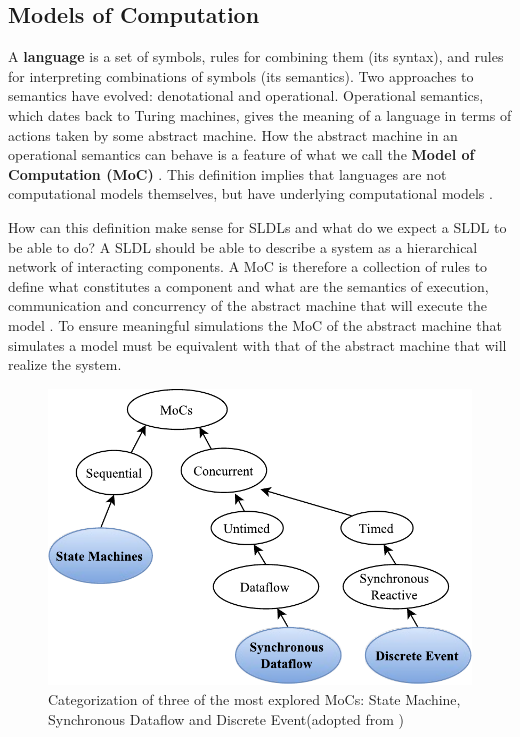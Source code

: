 \documentclass[12pt,twoside]{article}
\begin{document}
\subsection{Models of Computation}
\label{sec:orgheadline3}
A \textbf{language} is a set of symbols, rules for combining them (its syntax), and rules for interpreting combinations of symbols (its semantics). 
Two approaches to semantics have evolved: denotational and operational.
Operational semantics, which dates back to Turing machines, gives the meaning of a language in terms of actions taken by some abstract machine. 
How the abstract machine in an operational semantics can behave is a feature of what we call the \textbf{Model of Computation (MoC)} \cite{Edwards1997}.
This definition implies that languages are not computational models themselves, but have underlying computational models \cite{Jantsch2005}.

How can this definition make sense for SLDLs and what do we expect a SLDL to be able to do? 
A SLDL should be able to describe a system as a hierarchical network of interacting components.
A MoC is therefore a collection of rules to define what constitutes a component and what are the semantics of execution, communication and concurrency of the abstract machine that will execute the model \cite{Jantsch2005,Editor2014}.
To ensure meaningful simulations the MoC of the abstract machine that simulates a model must be equivalent with that of the abstract machine that will realize the system.

\begin{figure}[htb]
\centering
\includegraphics[width=.9\linewidth]{Figures/MoCs.pdf}
\caption{\label{fig:orgparagraph1}
Categorization of three of the most explored MoCs: State Machine, Synchronous Dataflow and Discrete Event(adopted from \cite{Editor2014})}
\end{figure}
\end{document}
